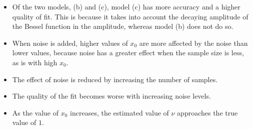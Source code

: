 \documentclass[11pt]{article}
\providecommand{\tightlist}{%
      \setlength{\itemsep}{0pt}\setlength{\parskip}{0pt}}
\begin{document}
\begin{itemize}
\tightlist
\item
  Of the two models, (b) and (c), model (c) has more accuracy and a
  higher quality of fit. This is because it takes into account the
  decaying amplitude of the Bessel function in the amplitude, whereas
  model (b) does not do so.
\item
  When noise is added, higher values of \(x_0\) are more affected by the
  noise than lower values, because noise has a greater effect when the
  sample size is less, as is with high \(x_0\).
\item
  The effect of noise is reduced by increasing the number of samples.
\item
  The quality of the fit becomes worse with increasing noise levels.
\item
  As the value of \(x_0\) increases, the estimated value of \(\nu\)
  approaches the true value of \(1\).
\end{itemize}

	


    
    
    
    
\end{document}

